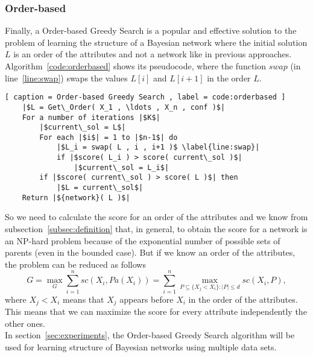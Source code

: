 \subsubsection{Order-based}
\label{subsub:orderbased}
Finally, a Order-based Greedy Search is a popular and effective solution to the problem of learning the structure of a Bayesian network where the initial solution $L$ is an order of the attributes and not a network like in previous approaches. Algorithm~\ref{code:orderbased} shows its pseudocode, where the function ${swap}$ (in line~\ref{line:swap}) swaps the values $L[ i ]$ and $L[ i + 1 ]$ in the order $L$.

\begin{lstlisting}[ caption = Order-based Greedy Search , label = code:orderbased ]
	|$L = Get\_Order( X_1 , \ldots , X_n , conf )$|
	For a number of iterations |$K$|
		|$current\_sol = L$|
		For each |$i$| = 1 to |$n-1$| do
			|$L_i = swap( L , i , i+1 )$ \label{line:swap}|
			if |$score( L_i ) > score( current\_sol )$|
				|$current\_sol = L_i$|
		if |$score( current\_sol ) > score( L )$| then
			|$L = current\_sol$|
	Return |${network}( L )$|
\end{lstlisting}
So we need to calculate the score for an order of the attributes and we know from subsection~\ref{subsec:definition} that, in general, to obtain the score for a network is an NP-hard problem because of the exponential number of possible sets of parents (even in the bounded case). But if we know an order of the attributes, the problem can be reduced as follows
	\begin{equation}
		\label{eq:orderreduced}
		G = \max_G \sum_{i=1}^{n} {sc}( X_i , {Pa}( X_i ) ) = \sum_{i=1}^{n} \max_{P \subseteq \{ X_j < X_i \}:|P|\leq d} {sc}( X_i , P ) ,
	\end{equation}
where $X_j < X_i$ means that $X_j$ appears before $X_i$ in the order of the attributes. This means that we can maximize the score for every attribute independently the other ones.\\
In section~\ref{sec:experiments}, the Order-based Greedy Search algorithm will be used for learning structure of Bayesian networks using multiple data sets.
